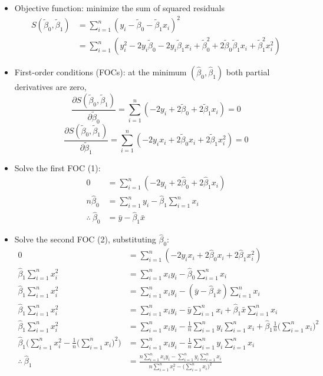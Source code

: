 \documentclass[11pt]{article}
\begin{document}
\begin{itemize}
\item Objective function: minimize the sum of squared residuals
\begin{align*}
S(\tilde{\beta}_0, \tilde{\beta}_1)
  &= \sum_{i=1}^n (y_i - \tilde{\beta}_0 - \tilde{\beta}_1 x_i)^2\\
  &= \sum_{i=1}^n (y_i^2 - 2 y_i \tilde{\beta}_0 - 2 y_i
  \tilde{\beta}_1 x_i + \tilde{\beta}_0^2 + 2 \tilde{\beta}_0
  \tilde{\beta}_1 x_i + \tilde{\beta}_1^2 x_i^2)
\end{align*}

\item First-order conditions (FOCs): at the minimum $(\hat\beta_0,\hat\beta_1)$ both partial derivatives are zero,
\begin{equation}
\frac{\partial S(\tilde{\beta}_0, \tilde{\beta}_1)}{\partial
  \tilde{\beta}_0} = \sum_{i=1}^n (-2 y_i + 2 \tilde{\beta}_0 + 2
\tilde{\beta}_1 x_i) = 0
\end{equation}
\begin{equation}
\frac{\partial S(\tilde{\beta}_0, \tilde{\beta}_1)}{\partial
  \tilde{\beta}_1} = \sum_{i=1}^n (-2 y_i x_i + 2 \tilde{\beta}_0 x_i
+ 2 \tilde{\beta}_1 x_i^2) = 0
\end{equation}

\item Solve the first FOC (1):
\begin{align*}
0 &= \sum_{i=1}^n (-2 y_i + 2 \hat{\beta}_0 + 2\hat{\beta}_1 x_i)  \\
n \hat{\beta}_0 &= \sum_{i=1}^n y_i - \hat{\beta}_1\sum_{i=1}^n x_i \\
\therefore\ \hat{\beta}_0 &=\bar y - \hat{\beta}_1\bar x
\end{align*}

\item Solve the second FOC (2), substituting $\hat\beta_0$:
\begin{align*}
0 &= \sum_{i=1}^n (-2 y_i x_i + 2 \hat{\beta}_0 x_i + 2 \hat{\beta}_1 x_i^2) \\
\hat\beta_1 \sum_{i=1}^n x_i^2 &= \sum_{i=1}^n x_i y_i - \hat\beta_0 \sum_{i=1}^n x_i \\
\hat\beta_1 \sum_{i=1}^n x_i^2 &= \sum_{i=1}^n x_i y_i - (\bar y - \hat{\beta}_1\bar x) \sum_{i=1}^n x_i \\
\hat\beta_1 \sum_{i=1}^n x_i^2 &= \sum_{i=1}^n x_i y_i - \bar y\sum_{i=1}^n x_i + \hat{\beta}_1\bar x \sum_{i=1}^n x_i \\
\hat\beta_1 \sum_{i=1}^n x_i^2 &= \sum_{i=1}^n x_i y_i - \frac{1}{n}\sum_{i=1}^n y_i\sum_{i=1}^n x_i + \hat{\beta}_1\frac{1}{n}\Big(\sum_{i=1}^n x_i\Big)^2 \\
\hat\beta_1 \Big(\sum_{i=1}^n x_i^2 - \frac{1}{n}\Big(\sum_{i=1}^n x_i\Big)^2\Big) &= \sum_{i=1}^n x_i y_i - \frac{1}{n}\sum_{i=1}^n y_i\sum_{i=1}^n x_i \\
\therefore\ \hat\beta_1  &= \frac{n\sum_{i=1}^n x_i y_i -\sum_{i=1}^n y_i\sum_{i=1}^n x_i}{n\sum_{i=1}^n x_i^2 - \big(\sum_{i=1}^n x_i\big)^2}
\end{align*}


\end{itemize}
\end{document}
